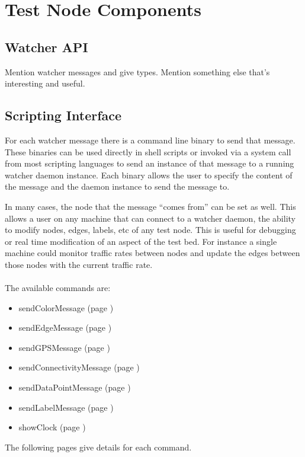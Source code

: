 \documentclass{article}
\begin{document}
\section{Test Node Components}
\subsection{Watcher API}
Mention watcher messages and give types. Mention something else that's interesting and useful. 

\subsection{Scripting Interface}
For each watcher message there is a command line binary to send that message. These binaries can be used directly in shell scripts or invoked via a system call from most scripting languages to send 
an instance of that message to a running watcher daemon instance. Each binary allows the user to specify the content of the message and the daemon instance to send the message to. 

In many cases, the node that the message ``comes from'' can be set as well. This allows a user on any machine that can connect to a watcher daemon, the ability to modify nodes, edges, labels, etc of any 
test node. This is useful for debugging or real time modification of an aspect of the test bed. For instance a single machine could monitor traffic rates between nodes and update 
the edges between those nodes with the current traffic rate. 
\\\\
The available commands are:
\begin{itemize}
\item sendColorMessage (page \pageref{sendColorMessage})
\item sendEdgeMessage (page \pageref{sendEdgeMessage})
\item sendGPSMessage (page \pageref{sendGPSMessage})
\item sendConnectivityMessage (page \pageref{sendConnectivityMessage})
\item sendDataPointMessage (page \pageref{sendDataPointMessage})
\item sendLabelMessage (page \pageref{sendLabelMessage})
\item showClock (page \pageref{showClock})
\end{itemize}
The following pages give details for each command.







\end{document}
